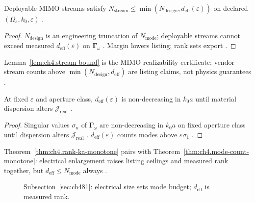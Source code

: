 \begin{lemma}
\label{lem:ch4.stream-bound}
Deployable MIMO streams satisfy \(N_{\mathrm{stream}}\le\min(N_{\mathrm{design}},d_{\mathrm{eff}}(\varepsilon))\) on declared \((\Omega_{s},k_{0},\varepsilon)\)
\cite{harrington2001,devaney2004,collin2001,hansen1988,stratton1941}.
\end{lemma}
\begin{proof}
\(N_{\mathrm{design}}\) is an engineering truncation of \(N_{\mathrm{mode}}\); deployable streams cannot exceed measured \(d_{\mathrm{eff}}(\varepsilon)\)
on \(\boldsymbol{\Gamma}_\omega\) \cite{harrington2001,devaney2004,collin2001}. Margin lowers listing; rank sets export \cite{stratton1941,hansen1988}.
\end{proof}

Lemma~\ref{lem:ch4.stream-bound} is the MIMO realizability certificate: vendor stream counts above \(\min(N_{\mathrm{design}},d_{\mathrm{eff}})\) are
listing claims, not physics guarantees \cite{collin2001,harrington2001,hansen1988,devaney2004}.

\begin{theorem}
\label{thm:ch4.rank-ka-monotone}
At fixed \(\varepsilon\) and aperture class, \(d_{\mathrm{eff}}(\varepsilon)\) is non-decreasing in \(k_{0}a\) until material dispersion alters
\(\mathcal{J}_{\mathrm{real}}\) \cite{hansen1988,harrington2001,stratton1941,devaney2004,jackson1999}.
\end{theorem}
\begin{proof}
Singular values \(\sigma_{n}\) of \(\boldsymbol{\Gamma}_\omega\) are non-decreasing in \(k_{0}a\) on fixed aperture class until dispersion alters
\(\mathcal{J}_{\mathrm{real}}\) \cite{hansen1988,harrington2001}. \(d_{\mathrm{eff}}(\varepsilon)\) counts modes above \(\varepsilon\sigma_{1}\)
\cite{stratton1941,devaney2004,jackson1999}.
\end{proof}

Theorem~\ref{thm:ch4.rank-ka-monotone} pairs with Theorem~\ref{thm:ch4.mode-count-monotone}: electrical enlargement raises listing ceilings and measured
rank together, but \(d_{\mathrm{eff}}\le N_{\mathrm{mode}}\) always \cite{collin2001,harrington2001,hansen1988,devaney2004}.

\begin{figure}[t]
\centering
{}
\caption{Subsection~\ref{sec:ch481}: electrical size sets mode budget; \(d_{\mathrm{eff}}\) is measured rank.}
\label{fig:ch4.mode-count-bound}
\end{figure}

